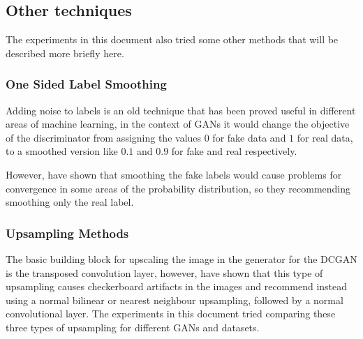 \subsection{Other techniques}
The experiments in this document also tried some other methods that will be described more briefly here.


\subsubsection{One Sided Label Smoothing}
Adding noise to labels is an old technique that has been proved useful in different areas of machine learning, in the context of \acp{GAN} it would change the objective of the discriminator from assigning the values $0$ for fake data and $1$ for real data, to a smoothed version like $0.1$ and $0.9$ for fake and real respectively.

However, \textcite{improvedGANS2016} have shown that smoothing the fake labels would cause problems for convergence in some areas of the probability distribution, so they recommending smoothing only the real label.

\subsubsection{Upsampling Methods}
The basic building block for upscaling the image in the generator for the \gls{DCGAN} is the transposed convolution layer, however, \textcite{deconvolutionArtifacts2016} have shown that this type of upsampling causes checkerboard artifacts in the images and recommend instead using a normal bilinear or nearest neighbour upsampling, followed by a normal convolutional layer. The experiments in this document tried comparing these three types of upsampling for different \acp{GAN} and datasets.


